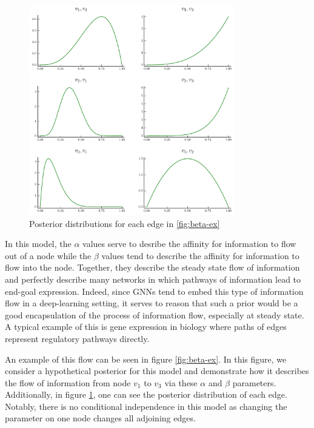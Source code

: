 \begin{figure}[t]
	\centering
	\includegraphics[width=0.8\textwidth]{images/beta_post.pdf}
	\caption{Posterior distributions for each edge in \ref{fig:beta-ex}}
	\label{fig:beta-ex-post}
\end{figure}

In this model, the $\alpha$ values serve to desribe the affinity for information to flow out of a node while the $\beta$ values tend to describe the affinity for information to flow into the node. Together, they describe the steady state flow of information and perfectly describe many networks in which pathways of information lead to end-goal expression. Indeed, since GNNs tend to embed this type of information flow in a deep-learning setting, it serves to reason that such a prior would be a good encapsulation of the process of information flow, especially at steady state. A typical example of this is gene expression in biology \cite{petralia_new_2016} where paths of edges represent regulatory pathways directly. 

An example of this flow can be seen in figure \ref{fig:beta-ex}. In this figure, we consider a hypothetical posterior for this model and demonstrate how it describes the flow of information from node $v_1$ to $v_3$ via these $\alpha$ and $\beta$ parameters. Additionally, in figure \ref{fig:beta-ex-post}, one can see the posterior distribution of each edge. Notably, there is no conditional independence in this model as changing the parameter on one node changes all adjoining edges.

